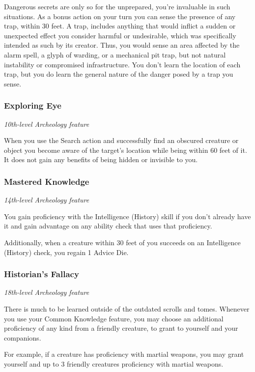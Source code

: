 \documentclass[letterpaper,openany,twoside,twocolumn]{book}
\begin{document}
	Dangerous secrets are only so for the unprepared, you're invaluable in such situations. As a bonus action on your turn you can sense the presence of any trap, within 30 feet. A trap, includes anything that would inflict a sudden or unexpected effect you consider harmful or undesirable, which was specifically intended as such by its creator. Thus, you would sense an area affected by the alarm spell, a glyph of warding, or a mechanical pit trap, but not natural instability or compromised infrastructure. You don't learn the location of each trap, but you do learn the general nature of the danger posed by a trap you sense.
	
	\subsubsection*{Exploring Eye}
	\textnormal{\textit{10th-level Archeology feature}}
	
	When you use the Search action and successfully find an obscured creature or object you become aware of the target's location while being within 60 feet of it. It does not gain any benefits of being hidden or invisible to you.
	
	\subsubsection*{Mastered Knowledge}
	\textnormal{\textit{14th-level Archeology feature}}
	
	You gain proficiency with the Intelligence (History) skill if you don’t already have it and gain advantage on any ability check that uses that proficiency.
	
	Additionally, when a creature within 30 feet of you succeeds on an Intelligence (History) check, you regain 1 Advice Die.
	
	\subsubsection*{Historian's Fallacy}
	\textnormal{\textit{18th-level Archeology feature}}
	
	There is much to be learned outside of the outdated scrolls and tomes. Whenever you use your Common Knowledge feature, you may choose an additional proficiency of any kind from a friendly creature, to grant to yourself and your companions.
	
	For example, if a creature has proficiency with martial weapons, you may grant yourself and up to 3 friendly creatures proficiency with martial weapons.
	
\end{document}
